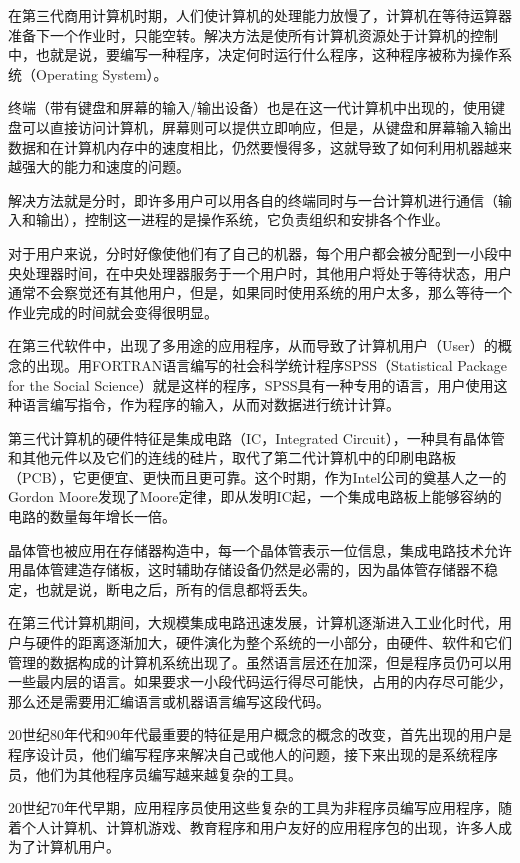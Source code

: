 在第三代商用计算机时期，人们使计算机的处理能力放慢了，计算机在等待运算器准备下一个作业时，只能空转。解决方法是使所有计算机资源处于计算机的控制中，也就是说，要编写一种程序，决定何时运行什么程序，这种程序被称为操作系统（Operating System）。

终端（带有键盘和屏幕的输入/输出设备）也是在这一代计算机中出现的，使用键盘可以直接访问计算机，屏幕则可以提供立即响应，但是，从键盘和屏幕输入输出数据和在计算机内存中的速度相比，仍然要慢得多，这就导致了如何利用机器越来越强大的能力和速度的问题。

解决方法就是分时，即许多用户可以用各自的终端同时与一台计算机进行通信（输入和输出），控制这一进程的是操作系统，它负责组织和安排各个作业。

对于用户来说，分时好像使他们有了自己的机器，每个用户都会被分配到一小段中央处理器时间，在中央处理器服务于一个用户时，其他用户将处于等待状态，用户通常不会察觉还有其他用户，但是，如果同时使用系统的用户太多，那么等待一个作业完成的时间就会变得很明显。

在第三代软件中，出现了多用途的应用程序，从而导致了计算机用户（User）的概念的出现。用FORTRAN语言编写的社会科学统计程序SPSS（Statistical Package for the Social Science）就是这样的程序，SPSS具有一种专用的语言，用户使用这种语言编写指令，作为程序的输入，从而对数据进行统计计算。

第三代计算机的硬件特征是集成电路（IC，Integrated Circuit），一种具有晶体管和其他元件以及它们的连线的硅片，取代了第二代计算机中的印刷电路板（PCB），它更便宜、更快而且更可靠。这个时期，作为Intel公司的奠基人之一的Gordon Moore发现了Moore定律，即从发明IC起，一个集成电路板上能够容纳的电路的数量每年增长一倍。

晶体管也被应用在存储器构造中，每一个晶体管表示一位信息，集成电路技术允许用晶体管建造存储板，这时辅助存储设备仍然是必需的，因为晶体管存储器不稳定，也就是说，断电之后，所有的信息都将丢失。

在第三代计算机期间，大规模集成电路迅速发展，计算机逐渐进入工业化时代，用户与硬件的距离逐渐加大，硬件演化为整个系统的一小部分，由硬件、软件和它们管理的数据构成的计算机系统出现了。虽然语言层还在加深，但是程序员仍可以用一些最内层的语言。如果要求一小段代码运行得尽可能快，占用的内存尽可能少，那么还是需要用汇编语言或机器语言编写这段代码。

20世纪80年代和90年代最重要的特征是用户概念的概念的改变，首先出现的用户是程序设计员，他们编写程序来解决自己或他人的问题，接下来出现的是系统程序员，他们为其他程序员编写越来越复杂的工具。

20世纪70年代早期，应用程序员使用这些复杂的工具为非程序员编写应用程序，随着个人计算机、计算机游戏、教育程序和用户友好的应用程序包的出现，许多人成为了计算机用户。

